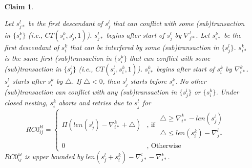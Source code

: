 \documentclass[letter]{sig-alternate}
\newtheorem{clm}{Claim}
\begin{document}
\begin{clm}\label{clm:parent_child_retry_cost}

Let $s_{j*}^{l}$ be the first descendant of $s_{j}^{l}$ that can
conflict with some (sub)transaction in $\{s_{i}^{k}\}$ (i.e., $CT(s_{i}^{k},s_{j}^{l},1)$).
$s_{j*}^{l}$ begins after start of $s_{j}^{l}$ by $\nabla_{j*}^{l}$.
Let $s_{i*}^{k}$ be the first descendant of $s_{i}^{k}$ that can
be interfered by some (sub)transaction in $\{s_{j}^{l}\}$. $s_{i*}^{k}$
is the same first (sub)transaction in $\{s_{i}^{k}\}$ that can conflict
with some (sub)transaction in $\{s_{j}^{l}\}$ (i.e., $CT(s_{j}^{l},s_{i}^{k},1)$).
$s_{i*}^{k}$ begins after start of $s_{i}^{k}$ by $\nabla_{i*}^{k}$.
$s_{j}^{l}$ starts after $s_{i}^{k}$ by $\triangle$. If $\triangle<0$,
then $s_{j}^{l}$ starts before $s_{i}^{k}$. No other (sub)transaction
can conflict with any (sub)transaction in $\{s_{j}^{l}\}$ or $\{s_{i}^{k}\}$.
Under closed nesting, $s_{i}^{k}$ aborts and retries due to $s_{j}^{l}$
for 
\begin{equation}
RC0_{ij}^{kl}=\begin{cases}
\Pi\left(len\left(s_{j}^{l}\right)-\nabla_{i*}^{k}+\triangle\right) & \mbox{, if }\begin{gathered}\triangle\ge\nabla_{i*}^{k}-len\left(s_{j}^{l}\right)\\
\triangle\le len\left(s_{i}^{k}\right)-\nabla_{j*}^{l}
\end{gathered}
\\
0 & \mbox{, Otherwise}
\end{cases}\label{eq:parent_child_retry_cost}
\end{equation}
%
$RC0_{ij}^{kl}$ is upper bounded by $len\left(s_{j}^{l}+s_{i}^{k}\right)-\nabla_{j*}^{l}-\nabla_{i*}^{k}$.

\end{clm}
\end{document}
